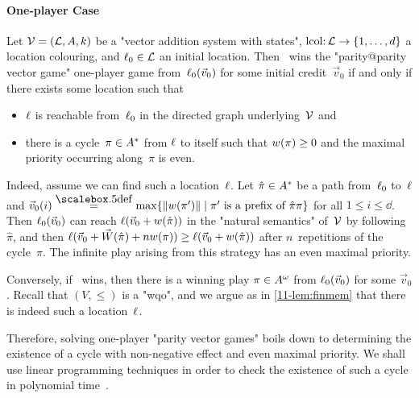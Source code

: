 \paragraph{One-player Case}
Let $\mathcal V=(\mathcal L,A,k)$ be a "vector addition system with states",
$\mathrm{lcol}{:}\,\mathcal L\to\{1,\dots,d\}$ a location colouring, and
$\ell_0\in\mathcal L$ an initial location.  Then \Eve\ wins the
"parity@parity vector game" one-player game from~$\ell_0(\vec v_0)$
for some initial credit~$\vec v_0$ if and only if there exists some
location such that
\begin{itemize}
\item $\ell$ is reachable from~$\ell_0$ in the directed graph
  underlying~$\mathcal V$ and
\item there is a cycle~$\pi\in A^\ast$ from $\ell$ to itself such
  that $w(\pi)\geq 0$ and the maximal priority occurring
  along~$\pi$ is even.
\end{itemize}
Indeed, assume we can find such a location~$\ell$.  Let
$\hat\pi\in A^\ast$ be a path from~$\ell_0$ to~$\ell$ and $\vec
v_0(i)\eqdef\max\{\|\weight(\pi')\|\mid\pi'\text{ is a prefix of
}\hat\pi\pi\}$ for all $1\leq i\leq\dd$.  Then $\ell_0(\vec v_0)$ can
reach $\ell(\vec v_0+w(\hat\pi))$ in the "natural semantics"
of~$\mathcal V$ by following~$\hat\pi$, and then $\ell(\vec v_0+\vec
W(\hat\pi)+nw(\pi))\geq \ell(\vec v_0+w(\hat\pi))$ after
$n$~repetitions of the cycle~$\pi$.  The infinite play arising from
this strategy has an even maximal priority.

Conversely, if \Eve\ wins, then there is a winning play
$\pi\in A^\omega$ from $\ell_0(\vec v_0)$ for some $\vec v_0$.
Recall that $(V,{\leq})$ is a "wqo", and we argue as in
\cref{11-lem:finmem} that there is indeed such a location~$\ell$.

\medskip
Therefore, solving one-player "parity vector games" boils down to
determining the existence of a cycle with non-negative effect and even
maximal priority.  We shall use linear programming techniques in order
to check the existence of such a cycle in polynomial
time~\cite{Kosaraju&Sullivan:1988}.

